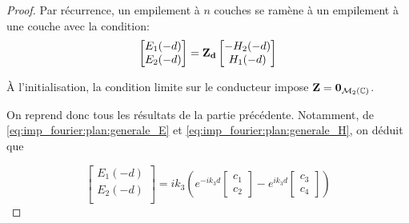         \begin{proof}
            Par récurrence, un empilement à $n$ couches se ramène à un empilement à une couche avec la condition:
            \begin{equation}
                \begin{bmatrix}
                    E_1(-d)\\
                    E_2(-d)\\
                \end{bmatrix}
                =
                \mathbf{Z_{d}} 
                \begin{bmatrix}
                    -H_2(-d)\\
                    H_1(-d)\\
                \end{bmatrix}
            \end{equation}

            À l'initialisation, la condition limite sur le conducteur impose $\mathbf{Z} = \mathbf{0}_{\mathcal{M}_2(\mathbb C)}$.

            On reprend donc tous les résultats de la partie précédente. Notamment, de \eqref{eq:imp_fourier:plan:generale_E} et \eqref{eq:imp_fourier:plan:generale_H}, on déduit que

            \begin{equation}
                \begin{bmatrix}
                    E_1(-d)\\
                    E_2(-d)\\
                \end{bmatrix}
                = ik_3\left( e^{-ik_3 d}
                \begin{bmatrix}
                    c_1 \\
                    c_2
                \end{bmatrix}
                -e^{ik_3 d}
                \begin{bmatrix}
                    c_3 \\
                    c_4
                \end{bmatrix}
                \right)
            \end{equation}


\end{proof}
